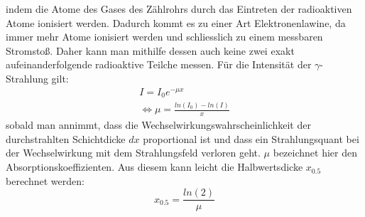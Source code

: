 \documentclass[11pt,a4paper]{article}
\begin{document}
  indem die Atome des Gases des Z\"ahlrohrs durch das Eintreten der radioaktiven Atome ionisiert werden. Dadurch kommt es zu einer Art Elektronenlawine, da immer mehr Atome ionisiert werden und schliesslich zu einem messbaren
  Stromsto{\ss}. Daher kann man mithilfe dessen auch keine zwei exakt aufeinanderfolgende radioaktive Teilche messen.
  F\"ur die Intensit\"at der $\gamma$-Strahlung gilt:
   \begin{align}
    I = {I}_{0}{e}^{- \mu x} \\
    \Leftrightarrow \mu = \frac{ln(I_0)-ln(I)}{x} \label{Absorption}
   \end{align}
  sobald man annimmt, dass die Wechselwirkungswahrscheinlichkeit der durchstrahlten
  Schichtdicke $dx$ proportional ist und dass ein Strahlungsquant bei der Wechselwirkung mit dem Strahlungsfeld verloren geht. $\mu$ bezeichnet hier den Absorptionskoeffizienten. 
  Aus diesem kann leicht die Halbwertsdicke $x_{0.5}$ berechnet werden:
  \begin{equation}
  	x_{0.5} = \frac{ln(2)}{\mu} \label{HWD}
  \end{equation}
\end{document}
